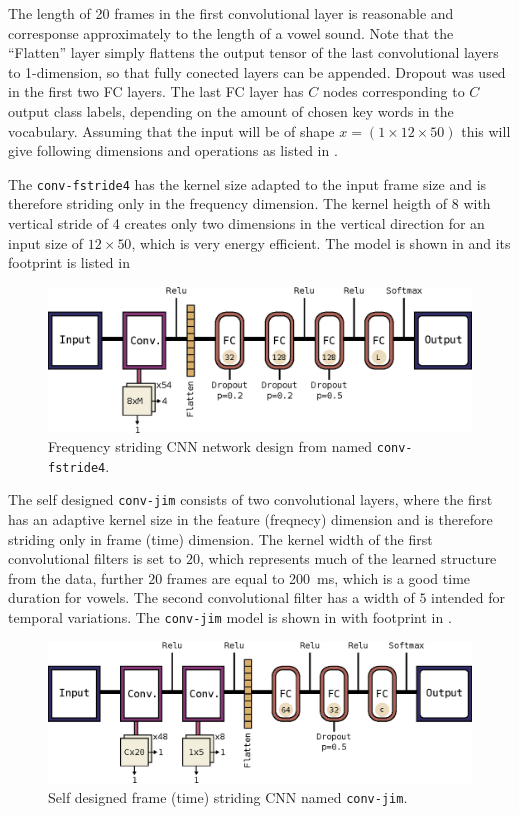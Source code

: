 The length of 20 frames in the first convolutional layer is reasonable and corresponse approximately to the length of a vowel sound.
Note that the \enquote{Flatten} layer simply flattens the output tensor of the last convolutional layers to 1-dimension, so that fully conected layers can be appended.
Dropout was used in the first two FC layers.
The last FC layer has $C$ nodes corresponding to $C$ output class labels, depending on the amount of chosen key words in the vocabulary.
Assuming that the input will be of shape $x = (1 \times 12 \times 50)$ this will give following dimensions and operations as listed in .


The \texttt{conv-fstride4} has the kernel size adapted to the input frame size and is therefore striding only in the frequency dimension.
The kernel heigth of 8 with vertical stride of 4 creates only two dimensions in the vertical direction for an input size of $12 \times 50$, which is very energy efficient. 
The model is shown in  and its footprint is listed in 
\begin{figure}[!ht]
  \centering
    \includegraphics[height=0.2\textwidth]{./4_nn/figs/nn_arch_cnn_fstride.eps}
  \caption{Frequency striding CNN network design from \cite{Sainath2015} named \texttt{conv-fstride4}.}
  \label{fig:nn_arch_cnn_fstride}
\end{figure}
\FloatBarrier
\noindent

The self designed \texttt{conv-jim} consists of two convolutional layers, where the first has an adaptive kernel size in the feature (freqnecy) dimension and is therefore striding only in frame (time) dimension.
The kernel width of the first convolutional filters is set to $20$, which represents much of the learned structure from the data, further $20$ frames are equal to \SI{200}{\milli\second}, which is a good time duration for vowels.
The second convolutional filter has a width of $5$ intended for temporal variations.
The \texttt{conv-jim} model is shown in  with footprint in .
\begin{figure}[!ht]
  \centering
    \includegraphics[height=0.2\textwidth]{./4_nn/figs/nn_arch_cnn_conv-jim.eps}
  \caption{Self designed frame (time) striding CNN named \texttt{conv-jim}.}
  \label{fig:nn_arch_cnn_conv-jim}
\end{figure}
\FloatBarrier
\noindent



